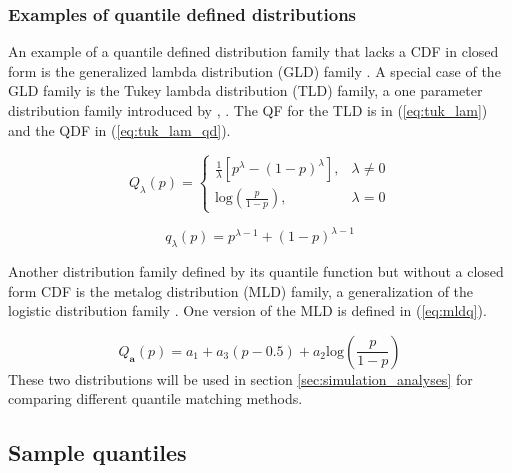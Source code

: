\documentclass[preprint,12pt,authoryear]{elsarticle}
\begin{document}
\subsubsection{Examples of quantile defined distributions} \label{sec:quant_def_dist}

An example of a quantile defined distribution family that lacks a CDF in closed form is the generalized lambda distribution (GLD) family \cite[]{ramberg1974approximate, perepolkin2023tenets}. A special case of the GLD family is the Tukey lambda distribution (TLD) family, a one parameter distribution family introduced by \cite{tukey1960practical}, \cite[]{joiner1971some}. The QF for the TLD is in (\ref{eq:tuk_lam}) and the QDF in (\ref{eq:tuk_lam_qd}).   

\begin{equation}
    \label{eq:tuk_lam}
    Q_{\lambda}(p) = \begin{cases} 
      \frac{1}{\lambda} \left[p^{\lambda} - (1 - p)^{\lambda} \right], & \lambda \neq 0 \\
      \text{log} \left(\frac{p}{1 - p} \right), & \lambda = 0
   \end{cases}
\end{equation}

\begin{equation}
    \label{eq:tuk_lam_qd}
    q_{\lambda}(p) = p^{\lambda - 1} + (1-p)^{\lambda -1} 
\end{equation}

Another distribution family defined by its quantile function but without a closed form CDF is the metalog distribution (MLD) family, a generalization of the logistic distribution family \cite[]{keelin2016metalog}. One version of the MLD is defined in (\ref{eq:mldq}).

\begin{equation}
    \label{eq:mldq}
    Q_{\textbf{a}}(p) = a_1 + a_3(p - 0.5) + a_2\text{log}\left(\frac{p}{1-p} \right)
\end{equation}
These two distributions will be used in section \ref{sec:simulation_analyses} for comparing different quantile matching methods.


















\subsection{Sample quantiles} \label{sec:samp_quants}
\end{document}
